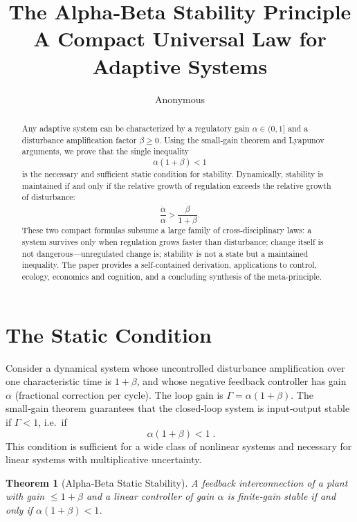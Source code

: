 \documentclass[11pt]{article}
\title{\textbf{The Alpha‑Beta Stability Principle}\\[4pt]
\small A Compact Universal Law for Adaptive Systems}
\author{Anonymous}
\date{}
\newtheorem{theorem}{Theorem}[section]
\begin{document}
\maketitle

\begin{abstract}
Any adaptive system can be characterized by a regulatory gain $\alpha \in (0,1]$ and a disturbance amplification factor $\beta \ge 0$.  Using the small‑gain theorem and Lyapunov arguments, we prove that the single inequality
\[
\alpha(1+\beta) < 1
\]
is the necessary and sufficient static condition for stability.  Dynamically, stability is maintained if and only if the relative growth of regulation exceeds the relative growth of disturbance:
\[
\frac{\dot\alpha}{\alpha} > \frac{\dot\beta}{1+\beta}.
\]
These two compact formulas subsume a large family of cross‑disciplinary laws: a system survives only when regulation grows faster than disturbance; change itself is not dangerous—unregulated change is; stability is not a state but a maintained inequality.  The paper provides a self‑contained derivation, applications to control, ecology, economics and cognition, and a concluding synthesis of the meta‑principle.
\end{abstract}

\section{The Static Condition}
Consider a dynamical system whose uncontrolled disturbance amplification over one characteristic time is $1+\beta$, and whose negative feedback controller has gain $\alpha$ (fractional correction per cycle).  The loop gain is $\Gamma = \alpha(1+\beta)$.  The small‑gain theorem \cite{zames1966} guarantees that the closed‑loop system is input‑output stable if $\Gamma < 1$, i.e.\ if
\begin{equation}\label{eq:static}
\boxed{\;\alpha(1+\beta) < 1\;}.
\end{equation}
This condition is sufficient for a wide class of nonlinear systems and necessary for linear systems with multiplicative uncertainty.

\begin{theorem}[Alpha‑Beta Static Stability]\label{thm:static}
A feedback interconnection of a plant with gain $\le 1+\beta$ and a linear controller of gain $\alpha$ is finite‑gain stable if and only if $\alpha(1+\beta)<1$.
\end{theorem}
\end{document}
